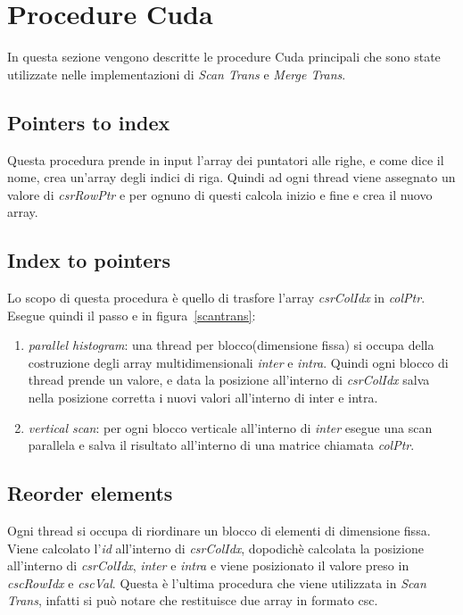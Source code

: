 \documentclass[]{IEEEtran}
\newcommand*\circled[1]{\tikz[baseline=(char.base)]{\node[shape=circle,draw,inner sep=2pt] (char) {#1};}}
\begin{document}
\section{Procedure Cuda}
\label{procedure}
	In questa sezione vengono descritte le procedure Cuda principali che sono state utilizzate nelle implementazioni di \textit{Scan Trans} e \textit{Merge Trans}.

	\subsection{Pointers to index}
	\label{pnt-to-idx}
	Questa procedura prende in input l'array dei puntatori alle righe, e come dice il nome, crea un'array degli indici di riga. Quindi ad ogni thread viene assegnato un valore di \textit{csrRowPtr} e per ognuno di questi calcola inizio e fine e crea il nuovo array.
	
	\subsection{Index to pointers}
	\label{idx-to-pnt}
	Lo scopo di questa procedura è quello di trasfore l'array \textit{csrColIdx} in \textit{colPtr}. Esegue quindi il passo \circled{1} e \circled{2} in figura~\ref{scantrans}:
	\begin{enumerate}
		\item \textit{parallel histogram}: una thread per blocco(dimensione fissa) si occupa della costruzione degli array multidimensionali \textit{inter} e \textit{intra}. Quindi ogni blocco di thread prende un valore, e data la posizione all'interno di \textit{csrColIdx} salva nella posizione corretta i nuovi valori all'interno di inter e intra.
		\item \textit{vertical scan}: per ogni blocco verticale all'interno di \textit{inter} esegue una scan parallela e salva il risultato all'interno di una matrice chiamata \textit{colPtr}.
	\end{enumerate}

	\subsection{Reorder elements}
	\label{reoder-elem}
	Ogni thread si occupa di riordinare un blocco di elementi di dimensione fissa. Viene calcolato l'\textit{id} all'interno di \textit{csrColIdx}, dopodichè calcolata la posizione all'interno di \textit{csrColIdx}, \textit{inter} e \textit{intra} e viene posizionato il valore preso in \textit{cscRowIdx} e \textit{cscVal}. 
	Questa è l'ultima procedura che viene utilizzata in \textit{Scan Trans}, infatti si può notare che restituisce due array in formato csc.
\end{document}
